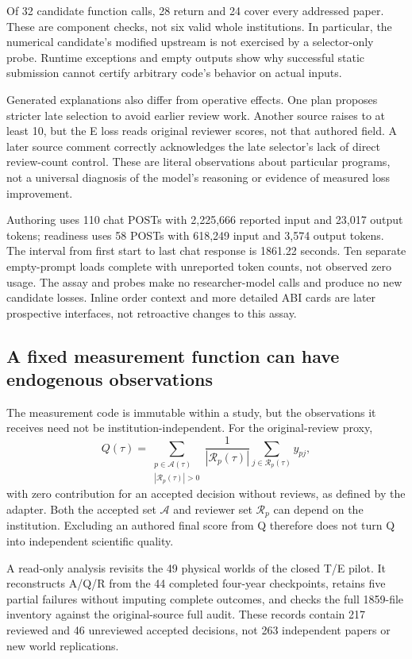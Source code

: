 Of 32 candidate function calls, 28 return and 24 cover every addressed paper.
These are component checks, not six valid whole institutions. In particular,
the numerical candidate's modified upstream is not exercised by a selector-only
probe. Runtime exceptions and empty outputs show why successful static
submission cannot certify arbitrary code's behavior on actual inputs.

Generated explanations also differ from operative effects. One plan proposes
stricter late selection to avoid earlier review work. Another source raises
 to at least 10, but the E loss reads original reviewer scores,
not that authored field. A later source comment correctly acknowledges the
late selector's lack of direct review-count control. These are literal
observations about particular programs, not a universal diagnosis of the
model's reasoning or evidence of measured loss improvement.

Authoring uses 110 chat POSTs with 2,225,666 reported input and 23,017 output
tokens; readiness uses 58 POSTs with 618,249 input and 3,574 output tokens.
The interval from first start to last chat response is 1861.22 seconds.
Ten separate empty-prompt loads complete with unreported token counts, not
observed zero usage. The assay and probes make no researcher-model calls and
produce no new candidate losses. Inline order context and more detailed ABI
cards are later prospective interfaces, not retroactive changes to this assay.

\subsection{A fixed measurement function can have endogenous observations}
The measurement code is immutable within a study, but the observations it
receives need not be institution-independent. For the original-review proxy,
\begin{equation}
 Q(\tau)=\sum_{\substack{p\in\mathcal A(\tau)\\|\mathcal R_p(\tau)|>0}}
  \frac{1}{|\mathcal R_p(\tau)|}\sum_{j\in\mathcal R_p(\tau)}y_{pj},
 \label{eq:endogenous-panel}
\end{equation}
with zero contribution for an accepted decision without reviews, as defined
by the adapter. Both the accepted set $\mathcal A$ and reviewer set
$\mathcal R_p$ can depend on the institution. Excluding an authored final
score from Q therefore does not turn Q into independent scientific quality.

A read-only analysis revisits the 49 physical worlds of the closed 
T/E pilot. It reconstructs A/Q/R from the 44 completed four-year checkpoints,
retains five partial failures without imputing complete outcomes, and checks
the full 1859-file inventory against the original-source full audit. These
records contain 217 reviewed and 46 unreviewed accepted decisions, not 263
independent papers or new world replications.

